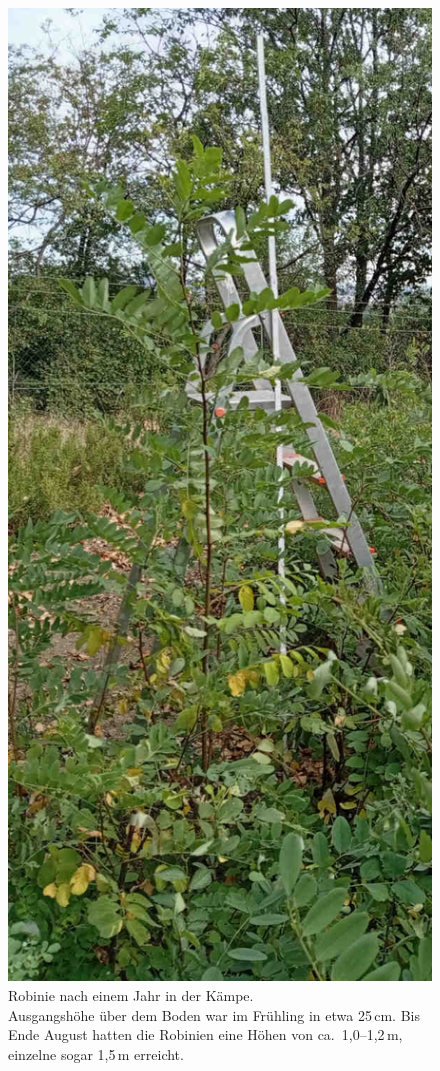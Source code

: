 \documentclass[twocolumn]{scrartcl}
\begin{document}
\begin{figure}[htbp]
  \centering
  \includegraphics[width=.9\linewidth]{./bild/robinieEinJahr}
  \caption{Robinie nach einem Jahr in der Kämpe.\\
  Ausgangshöhe über dem Boden war im Frühling in etwa 25\,cm.
  Bis Ende August hatten die
  Robinien eine Höhen von ca.\ 1,0--1,2\,m, einzelne sogar 1,5\,m erreicht.}
  \label{fig:robinieEinJahr}
\end{figure}
\end{document}
